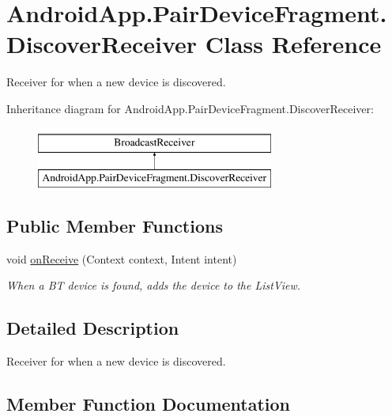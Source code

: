 \hypertarget{class_android_app_1_1_pair_device_fragment_1_1_discover_receiver}{}\section{Android\+App.\+Pair\+Device\+Fragment.\+Discover\+Receiver Class Reference}
\label{class_android_app_1_1_pair_device_fragment_1_1_discover_receiver}


Receiver for when a new device is discovered.  


Inheritance diagram for Android\+App.\+Pair\+Device\+Fragment.\+Discover\+Receiver\+:\begin{figure}[H]
\begin{center}
\leavevmode
\includegraphics[height=2.000000cm]{class_android_app_1_1_pair_device_fragment_1_1_discover_receiver}
\end{center}
\end{figure}
\subsection*{Public Member Functions}
\begin{DoxyCompactItemize}
\item 
void \hyperlink{class_android_app_1_1_pair_device_fragment_1_1_discover_receiver_aed29343e83655c50dee0eb9253eb0b85}{on\+Receive} (Context context, Intent intent)
\begin{DoxyCompactList}\small\item\em When a BT device is found, adds the device to the List\+View. \end{DoxyCompactList}\end{DoxyCompactItemize}


\subsection{Detailed Description}
Receiver for when a new device is discovered. 

\subsection{Member Function Documentation}
\mbox{\label{class_android_app_1_1_pair_device_fragment_1_1_discover_receiver_aed29343e83655c50dee0eb9253eb0b85}} 
